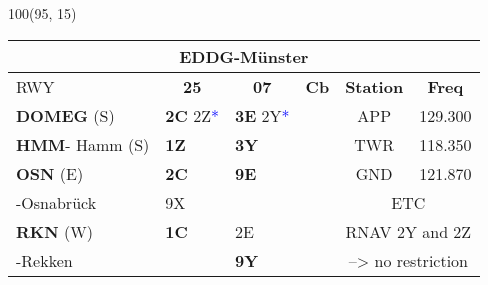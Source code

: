 \documentclass[10pt,landscape,a4paper]{article}
\begin{document}
\begin{textblock}{100}(95, 15)
\begin{table}[]
\begin{tabular}{|llllll}
\multicolumn{6}{c}{\textbf{EDDG-Münster}} \\ \hline
\multicolumn{1}{|l|}{RWY} 									& \multicolumn{1}{c|}{\textbf{25}} 			& \multicolumn{1}{c|}{\textbf{07}}  				& \multicolumn{1}{c|}{\textbf{Cb}} 						& \multicolumn{1}{c|}{\textbf{Station}} 	& \multicolumn{1}{c|}{\textbf{Freq}}\\ \hline
\multicolumn{1}{|l|}{\textbf{DOMEG} (S)}							& \multicolumn{1}{l|}{\textbf{2C} 2Z\textcolor{blue}{*}}			& \multicolumn{1}{l|}{\textbf{3E} 2Y\textcolor{blue}{*}} 				& \multicolumn{1}{c|}{\multirow{6}{*}{\rotatebox{90}{5000ft}}}		& \multicolumn{1}{c|}{APP}		& \multicolumn{1}{c|}{129.300}\\
\multicolumn{1}{|l|}{\textbf{HMM}- Hamm (S)}						& \multicolumn{1}{l|}{\textbf{1Z}}			& \multicolumn{1}{l|}{\textbf{3Y}}				& \multicolumn{1}{c|}{}  								& \multicolumn{1}{c|}{TWR}		& \multicolumn{1}{c|}{118.350} \\ \cline{1-3}

\multicolumn{1}{|l|}{\textbf{OSN} (E)} 								& \multicolumn{1}{l|}{\textbf{2C} } 			& \multicolumn{1}{l|}{\textbf{9E}}				& \multicolumn{1}{c|}{} 								& \multicolumn{1}{c|}{GND} 		& \multicolumn{1}{c|}{121.870} \\ \cline{5-6}
\multicolumn{1}{|l|}{-Osnabrück}								& \multicolumn{1}{l|}{9X}					& \multicolumn{1}{l|}{}						& \multicolumn{1}{c|}{} 								& \multicolumn{2}{c|}{ETC}							\\ \cline{1-3} \cline{5-6}

\multicolumn{1}{|l|}{\textbf{RKN} (W)} 							& \multicolumn{1}{l|}{\textbf{1C}}			& \multicolumn{1}{l|}{2E}						& \multicolumn{1}{c|}{}								& \multicolumn{2}{c|}{RNAV 2Y and 2Z }			\\
\multicolumn{1}{|l|}{-Rekken} 									& \multicolumn{1}{l|}{\textbf{}} 				& \multicolumn{1}{l|}{\textbf{9Y}}				& \multicolumn{1}{c|}{}  								& \multicolumn{2}{c|}{--> no restriction}\\ \hline
\end{tabular}
\end{table}
\end{textblock}
\end{document}
